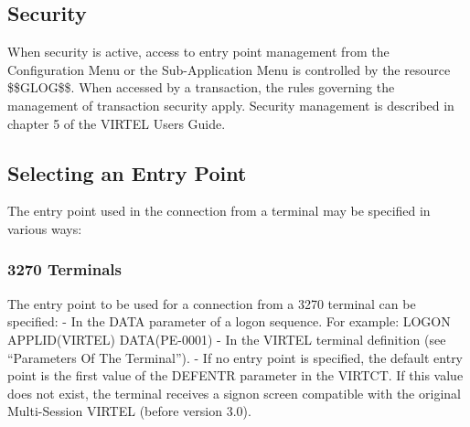\documentclass[letterpaper,10pt,english]{sphinxmanual}
\begin{document}
\ignorespaces 

\subsection{Security}
\label{\detokenize{connectivity_guide:index-104}}\label{\detokenize{connectivity_guide:id55}}
When security is active, access to entry point management from the Configuration Menu or the Sub-Application Menu is controlled by the resource \$\$GLOG\$\$. When accessed by a transaction, the rules governing the management of transaction security apply. Security management is described in chapter 5 of the VIRTEL Users Guide.

\ignorespaces 

\subsection{Selecting an Entry Point}
\label{\detokenize{connectivity_guide:selecting-an-entry-point}}\label{\detokenize{connectivity_guide:index-105}}
The entry point used in the connection from a terminal may be specified in various ways:


\subsubsection{3270 Terminals}
\label{\detokenize{connectivity_guide:id56}}
The entry point to be used for a connection from a 3270 terminal can be specified:
- In the DATA parameter of a logon sequence. For example: LOGON APPLID(VIRTEL) DATA(PE-0001)
- In the VIRTEL terminal definition (see “Parameters Of The Terminal”).
- If no entry point is specified, the default entry point is the first value of the DEFENTR parameter in the VIRTCT. If this value does not exist, the terminal receives a signon screen compatible with the original Multi-Session VIRTEL (before version 3.0).
\end{document}
